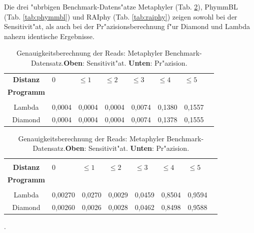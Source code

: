 \documentclass[10pt, a4paper]{report}[08.12.2015]
\begin{document}
     Die drei "ubrbigen Benchmark-Datens"atze Metaphyler (Tab. \ref{tab:meta}), PhymmBL (Tab. \ref{tab:phymmbl}) und RAIphy (Tab. \ref{tab:raiphy}) zeigen sowohl bei der Sensitivit"at, als auch bei der Pr"azisionsberechnung f"ur Diamond und Lambda nahezu identische Ergebnisse.
      \begin{table}[H]
        \begin{tabular}{clllllll}
          \textbf{Distanz}&0&$\leq1$&$\leq2$&$\leq3$&$\leq4$&$\leq5$\\
          \textbf{Programm}&&&&&\\ \hline  
          &&&&&&\\
          Lambda&0,0004&0,0004&0,0004&0,0074&0,1380&0,1557\\
          Diamond&0,0004&0,0004&0,0004&0,0074&0,1378&0,1555\\
        \end{tabular}

        \begin{tabular}{clllllll}
        &&&&&&\\
          \textbf{Distanz}&0&$\leq1$&$\leq2$&$\leq3$&$\leq4$&$\leq5$\\
          \textbf{Programm}&&&&&\\ \hline  
          &&&&&&\\
          Lambda&0,00270&0,0270&0,0029&0,0459&0,8504&0,9594\\
          Diamond&0,00260&0,0026&0,0028&0,0462&0,8498&0,9588\\
        \end{tabular}
        \caption[Genauigkeitsberechnung der Reads: Metaphyler Benchmark-Datensatz.]{\small{Genauigkeitsberechnung der Reads: Metaphyler Benchmark-Datensatz.\newline \textbf{Oben}: Sensitivit"at. \textbf{Unten}: Pr"azision.} }
        \label{tab:meta}
      \end{table}
    .
\end{document}
